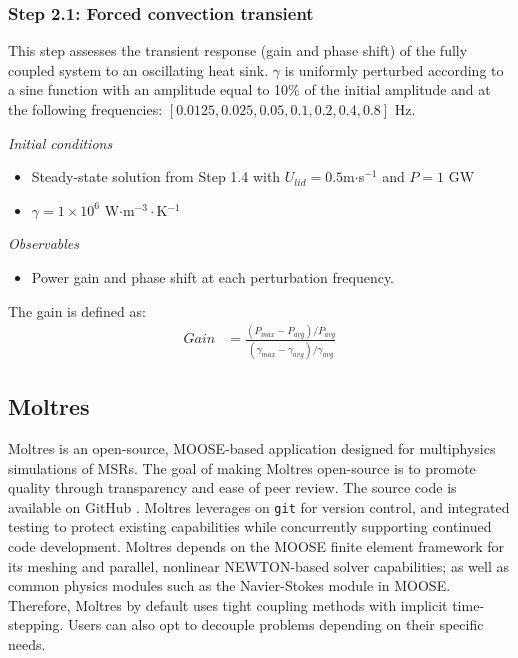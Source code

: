 \subsubsection{Step 2.1: Forced convection transient}

This step assesses the transient response (gain and phase shift) of the fully
coupled system to an oscillating heat sink. $\gamma$ is uniformly perturbed
according to a sine function with an amplitude equal to 10\% of the initial
amplitude and at the following frequencies: $[0.0125, 0.025, 0.05, 0.1, 0.2,
0.4, 0.8]$ Hz.

\textit{Initial conditions}
%
\begin{itemize}
    \itemsep0em
    \item Steady-state solution from Step 1.4 with
    $U_{lid} = 0.5 $m$\cdot$s$^{-1}$ and $P = 1$ GW
    \item $\gamma = 1 \times 10^6$ W$\cdot$m$^{-3}\cdot$K$^{-1}$
\end{itemize}

\textit{Observables}
\begin{itemize}
    \itemsep0em
    \item Power gain and phase shift at each perturbation frequency.
\end{itemize}
%
The gain is defined as:
%
\begin{align}
    Gain &= \frac{(P_{max} - P_{avg})/P_{avg}}{(\gamma_{max} - \gamma_{avg})/
    \gamma_{avg}}
\end{align}

\subsection{Moltres}

Moltres \cite{lindsay_introduction_2018} is an open-source, \gls{MOOSE}-based
application designed for multiphysics simulations of \glspl{MSR}. The goal of
making Moltres open-source is to promote quality through transparency and
ease of peer review. The source code \cite{lindsay_moltres_2017} is available
on GitHub \cite{lindsay_moltres_2017}. Moltres leverages on \texttt{git} for
version control, and integrated testing to protect existing capabilities while
concurrently supporting continued code development. Moltres depends on the
\gls{MOOSE} finite element framework for its meshing and parallel, nonlinear
NEWTON-based solver capabilities; as well as common physics modules such as the
Navier-Stokes module \cite{peterson_overview_2017} in \gls{MOOSE}. Therefore,
Moltres by default uses tight coupling methods with implicit time-stepping.
Users can also opt to decouple problems depending on their specific needs.


